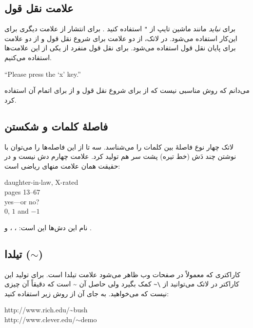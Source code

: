 \subsection{علامت نقل قول}

برای  {\it نباید}
مانند ماشین تایپ از \verb|"| استفاده کنید %
. برای انتشار از علامت دیگری برای این‌کار استفاده می‌شود. در لاتک، از دو علامت    
\lr{\textasciigrave} برای شروع نقل‌ قول و از دو علامت 
\lr{\textquotesingle} برای پایان نقل‌ قول استفاده می‌شود. برای نقل‌ قول منفرد از یکی از این علامت‌ها استفاده می‌کنیم.
\begin{example}
``Please press the `x' key.''
\end{example}

می‌دانم که روش مناسبی نیست که از \lr{\textasciigrave} برای شروع نقل قول و از  \lr{\textquotesingle}  برای اتمام آن استفاده کرد.
\subsection{فاصلهٔ کلمات و شکستن}

لاتک چهار نوع فاصلهٔ بین کلمات را می‌شناسد.  سه تا از این فاصله‌ها را می‌توان با نوشتن چند دَش (خط تیره) پشت سر هم تولید کرد. علامت چهارم دش نیست و در حقیقت همان علامت منهای ریاضی است: \romanindex{-}
\romanindex{--} \romanindex{---}  


\begin{example}
daughter-in-law, X-rated\\
pages 13--67\\
yes---or no? \\
$0$, $1$ and $-1$
\end{example}


نام این دش‌ها این است:
، ،  و 
.
\subsection{\texorpdfstring{تیلدا ($\sim$)}{تیلدا}}
کاراکتری که معمولاً در صفحات وب ظاهر می‌شود علامت تیلدا است. برای تولید این کاراکتر در لاتک می‌توانید از  \verb|\~| کمک بگیرد ولی حاصل آن  \~{} 
است که دقیقاً آن چیزی نیست که می‌خواهید. به جای آن از روش زیر استفاده کنید:


\begin{example}
http://www.rich.edu/\~{}bush \\
http://www.clever.edu/$\sim$demo
\end{example}
 
